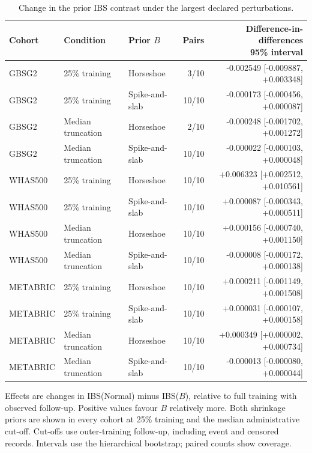 \begin{table}[p]
\centering
\footnotesize
\setlength{\tabcolsep}{3pt}
\caption{Change in the prior IBS contrast under the largest declared perturbations.}
\label{tab:report-information}
\begin{tabular}{@{}lllrr@{}}
\toprule
Cohort & Condition & Prior $B$ & Pairs & \shortstack[r]{Difference-in-differences\\95\% interval}\\
\midrule
GBSG2 & 25\% training & Horseshoe & 3/10 & -0.002549 [-0.009887, +0.003348]\\
GBSG2 & 25\% training & Spike-and-slab & 10/10 & -0.000173 [-0.000456, +0.000087]\\
GBSG2 & Median truncation & Horseshoe & 2/10 & -0.000248 [-0.001702, +0.001272]\\
GBSG2 & Median truncation & Spike-and-slab & 10/10 & -0.000022 [-0.000103, +0.000048]\\
WHAS500 & 25\% training & Horseshoe & 10/10 & +0.006323 [+0.002512, +0.010561]\\
WHAS500 & 25\% training & Spike-and-slab & 10/10 & +0.000087 [-0.000343, +0.000511]\\
WHAS500 & Median truncation & Horseshoe & 10/10 & +0.000156 [-0.000740, +0.001150]\\
WHAS500 & Median truncation & Spike-and-slab & 10/10 & -0.000008 [-0.000172, +0.000138]\\
METABRIC & 25\% training & Horseshoe & 10/10 & +0.000211 [-0.001149, +0.001508]\\
METABRIC & 25\% training & Spike-and-slab & 10/10 & +0.000031 [-0.000107, +0.000158]\\
METABRIC & Median truncation & Horseshoe & 10/10 & +0.000349 [+0.000002, +0.000734]\\
METABRIC & Median truncation & Spike-and-slab & 10/10 & -0.000013 [-0.000080, +0.000044]\\
\bottomrule
\end{tabular}
\par\smallskip
\begin{minipage}{\textwidth}\footnotesize Effects are changes in IBS(Normal) minus IBS($B$), relative to full training with observed follow-up. Positive values favour $B$ relatively more. Both shrinkage priors are shown in every cohort at 25\% training and the median administrative cut-off. Cut-offs use outer-training follow-up, including event and censored records. Intervals use the hierarchical bootstrap; paired counts show coverage.\end{minipage}
\end{table}
